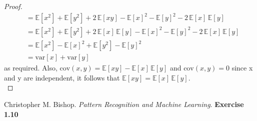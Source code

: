 \documentclass[14pt]{extarticle}
\begin{document}
\begin{flushleft}
\begin{large}
\begin{proof}
\begin{align}
&= \mathbb{E}[x^2] + \mathbb{E}[y^2] + 2\,\mathbb{E}[xy] - \mathbb{E}[x]^2 - \mathbb{E}[y]^2 - 2\,\mathbb{E}[x]\,\mathbb{E}[y]\\
&= \mathbb{E}[x^2] + \mathbb{E}[y^2] + 2\,\mathbb{E}[x]\,\mathbb{E}[y] - \mathbb{E}[x]^2 - \mathbb{E}[y]^2 - 2\,\mathbb{E}[x]\,\mathbb{E}[y]\\
&= \mathbb{E}[x^2] - \mathbb{E}[x]^2 + \mathbb{E}[y^2] - \mathbb{E}[y]^2\\
&= \mathrm{var}[x] + \mathrm{var}[y]
\end{align}
as required. Also, $\mathrm{cov}(x, y) = \mathbb{E}[xy] - \mathbb{E}[x]\,\mathbb{E}[y]$ and $\mathrm{cov}(x, y) = 0$ since x and y are independent, it follows that $\mathbb{E}[xy] = \mathbb{E}[x]\,\mathbb{E}[y]$.\\
\end{proof}
\end{large}
\end{flushleft}
\begin{thebibliography}{9}
Christopher M. Bishop. 
\textit{ Pattern Recognition and Machine Learning}.  
\textbf{Exercise 1.10}
\end{thebibliography}
\end{document}

